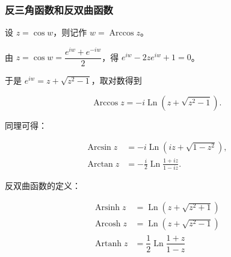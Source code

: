 \subsubsection{反三角函数和反双曲函数}
\label{反三角函数和反双曲函数}
设 \(z=\cos w\)，则记作 \(w=\operatorname{Arccos} z\)。

由 \(z=\cos w=\dfrac{e^{iw}+e^{-iw}}{2}\)，得 \(e^{iw}-2ze^{iw}+1=0\)。

于是 \(e^{iw}=z+\sqrt{z^2-1}\)，取对数得到

\[
\operatorname{Arccos}z=-i\operatorname{Ln}(z+\sqrt{z^2-1}).
\]

同理可得：

\begin{equation*}
\begin{aligned}
    \operatorname{Arcsin}z&=-i\operatorname{Ln}(iz+\sqrt{1-z^2}), \\
    \operatorname{Arctan}z&=-\frac{i}{2}\operatorname{Ln}\frac{1+iz}{1-iz}.
\end{aligned}
\end{equation*}

反双曲函数的定义：

\begin{equation*}
\begin{aligned}
 \operatorname{Arsinh}z &= \operatorname{Ln}(z + \sqrt{z^{2}+1}) \\
\operatorname{Arcosh}z &= \operatorname{Ln}(z + \sqrt{z^{2} - 1}) \\
\operatorname{Artanh}z &= \dfrac{1}{2}\operatorname{Ln}\dfrac{1 + z}{1 - z}
\end{aligned}
\end{equation*}
